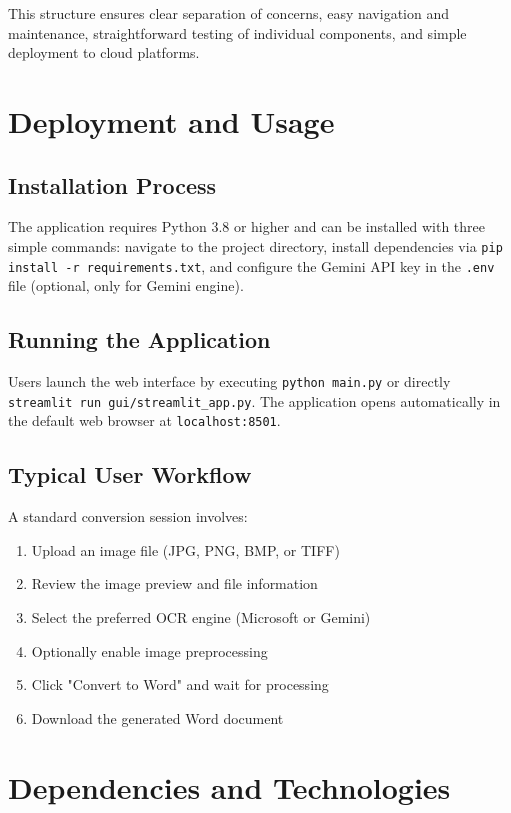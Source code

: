 \documentclass[12pt,a4paper]{article}
\begin{document}
This structure ensures clear separation of concerns, easy navigation and maintenance, straightforward testing of individual components, and simple deployment to cloud platforms.

\section{Deployment and Usage}

\subsection{Installation Process}
The application requires Python 3.8 or higher and can be installed with three simple commands: navigate to the project directory, install dependencies via \texttt{pip install -r requirements.txt}, and configure the Gemini API key in the \texttt{.env} file (optional, only for Gemini engine).

\subsection{Running the Application}
Users launch the web interface by executing \texttt{python main.py} or directly \texttt{streamlit run gui/streamlit\_app.py}. The application opens automatically in the default web browser at \texttt{localhost:8501}.

\subsection{Typical User Workflow}
A standard conversion session involves:
\begin{enumerate}
    \item Upload an image file (JPG, PNG, BMP, or TIFF)
    \item Review the image preview and file information
    \item Select the preferred OCR engine (Microsoft or Gemini)
    \item Optionally enable image preprocessing
    \item Click "Convert to Word" and wait for processing
    \item Download the generated Word document
\end{enumerate}

\section{Dependencies and Technologies}
\end{document}
